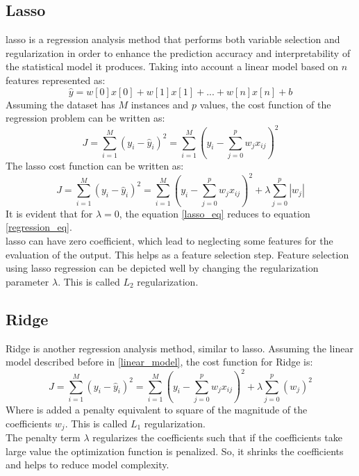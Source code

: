 \subsection{Lasso}
\gls{lasso} is a regression analysis method that performs both variable selection and regularization in order to enhance the prediction accuracy and interpretability of the statistical model it produces.
Taking into account a linear model based on $n$ features represented as:
\begin{equation}
	\hat{y}=w[0]x[0]+w[1]x[1]+...+w[n]x[n]+b
\end{equation}\label{linear_model}
Assuming the dataset has $M$ instances and $p$ values, the cost function of the regression problem can be written as:
\begin{equation}
	J=\sum_{i=1}^{M}{{(y_i-\hat{y}_i)}^2}=\sum_{i=1}^{M}{{ \left( y_i-\sum_{j=0}^{p}{w_jx_{ij}} \right) }^2}
\end{equation}\label{regression_eq}
The \gls{lasso} cost function can be written as:
\begin{equation}
	J=\sum_{i=1}^{M}{{(y_i-\hat{y}_i)}^2}=\sum_{i=1}^{M}{{ \left( y_i-\sum_{j=0}^{p}{w_jx_{ij}} \right) }^2}+\lambda \sum_{j=0}^{p}{|w_j|}
\end{equation}\label{lasso_eq}
It is evident that for $\lambda=0$, the equation \ref{lasso_eq} reduces to equation \ref{regression_eq}.
\\
\gls{lasso} can have zero coefficient, which lead to neglecting some features for the evaluation of the output. This helps as a feature selection step. Feature selection using \gls{lasso} regression can be depicted well by changing the regularization parameter $\lambda$. This is called $L_2$ regularization.

\subsection{Ridge}
Ridge is another regression analysis method, similar to \gls{lasso}. Assuming the linear model described before in \ref{linear_model}, the cost function for Ridge is:
\begin{equation}
	J=\sum_{i=1}^{M}{{(y_i-\hat{y}_i)}^2}=\sum_{i=1}^{M}{{ \left( y_i-\sum_{j=0}^{p}{w_jx_{ij}} \right) }^2}+\lambda \sum_{j=0}^{p}{{(w_j)}^2}
\end{equation}\label{ridge_eq}
Where is added a penalty equivalent to square of the magnitude of the coefficients $w_j$. This is called $L_1$ regularization.
\\
The penalty term $\lambda$ regularizes the coefficients such that if the coefficients take large value the optimization function is penalized. So, it shrinks the coefficients and helps to reduce model complexity.

